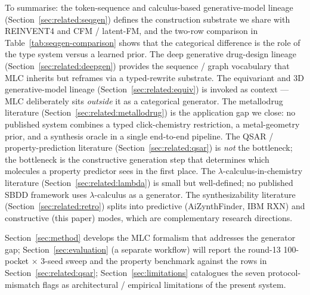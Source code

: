 To summarise: the token-sequence and calculus-based generative-model
lineage (Section~\ref{sec:related:seqgen}) defines the construction
substrate we share with REINVENT4 and CFM / latent-FM, and the
two-row comparison in Table~\ref{tab:seqgen-comparison} shows that
the categorical difference is the role of the type system versus a
learned prior. The deep generative drug-design lineage
(Section~\ref{sec:related:deepgen}) provides the
sequence / graph vocabulary that MLC inherits but reframes via a
typed-rewrite substrate. The equivariant and 3D generative-model
lineage (Section~\ref{sec:related:equiv}) is invoked as context ---
MLC deliberately sits \emph{outside} it as a categorical generator.
The metallodrug literature
(Section~\ref{sec:related:metallodrug}) is the application gap we
close: no published system combines a typed click-chemistry
restriction, a metal-geometry prior, and a synthesis oracle in a
single end-to-end pipeline. The QSAR / property-prediction
literature (Section~\ref{sec:related:qsar}) is \emph{not} the
bottleneck; the bottleneck is the constructive generation step that
determines which molecules a property predictor sees in the first
place. The $\lambda$-calculus-in-chemistry literature
(Section~\ref{sec:related:lambda}) is small but well-defined; no
published SBDD framework uses $\lambda$-calculus as a generator.
The synthesizability literature (Section~\ref{sec:related:retro})
splits into predictive (AiZynthFinder, IBM RXN) and constructive
(this paper) modes, which are complementary research directions.

Section~\ref{sec:method} develops the MLC formalism that addresses
the generator gap; Section~\ref{sec:evaluation} (a separate
workflow) will report the round-13 100-pocket $\times$ 3-seed
sweep and the property benchmark against the rows in
Section~\ref{sec:related:qsar}; Section~\ref{sec:limitations}
catalogues the seven protocol-mismatch flags as architectural /
empirical limitations of the present system.